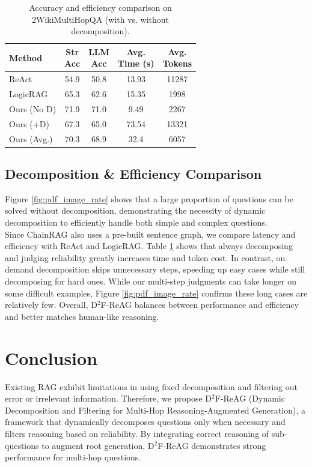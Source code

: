 \documentclass[11pt]{article}
\begin{document}
\begin{table}[htbp]
\centering
\renewcommand{\arraystretch}{0.9}
\setlength{\tabcolsep}{3.5pt}
\begin{tabular}{l c c c c}
\toprule
\textbf{Method}
& \makecell{\textbf{Str}\\\textbf{Acc}}
& \makecell{\textbf{LLM}\\\textbf{Acc}}
& \makecell{\textbf{Avg.}\\\textbf{Time (s)}}
& \makecell{\textbf{Avg.}\\\textbf{Tokens}} \\
\midrule
ReAct        & 54.9 & 50.8 & 13.93 & 11287 \\
LogicRAG     & 65.3 & 62.6 & 15.35 & 1998  \\
\midrule
Ours (No D)  & 71.9 & 71.0 & 9.49  & 2267  \\
Ours (+D)    & 67.3 & 65.0 & 73.54 & 13321 \\
Ours (Avg.)  & 70.3 & 68.9 & 32.4  & 6057  \\
\bottomrule
\end{tabular}
\caption{Accuracy and efficiency comparison on 2WikiMultiHopQA (with vs. without decomposition).}
\label{tab:2wiki_efficiency}
\end{table}
\subsection{Decomposition \& Efficiency Comparison}
Figure \ref{fig:pdf_image_rate} shows that a large proportion of questions can be solved without decomposition, demonstrating the necessity of dynamic decomposition to efficiently handle both simple and complex questions.\\
Since ChainRAG also uses a pre-built sentence graph, we compare latency and efficiency with ReAct and LogicRAG. Table \ref{tab:2wiki_efficiency} shows that always decomposing and judging reliability greatly increases time and token cost. In contrast, on-demand decomposition skips unnecessary steps, speeding up easy cases while still decomposing for hard ones. While our multi-step judgments can take longer on some difficult examples, Figure \ref{fig:pdf_image_rate} confirms these long cases are relatively few. Overall, D$^2$F-ReAG balances between performance and efficiency and better matches human-like reasoning.


\section{Conclusion}
Existing RAG exhibit limitations in using fixed decomposition and filtering out error or irrelevant information. Therefore, we propose D$^2$F-ReAG (Dynamic Decomposition and Filtering for Multi-Hop Reasoning-Augmented Generation), a framework that dynamically decomposes questions only when necessary and filters reasoning based on reliability. By integrating correct reasoning of sub-questions to augment root generation, D$^2$F-ReAG demonstrates strong performance for multi-hop questions.  
\end{document}
